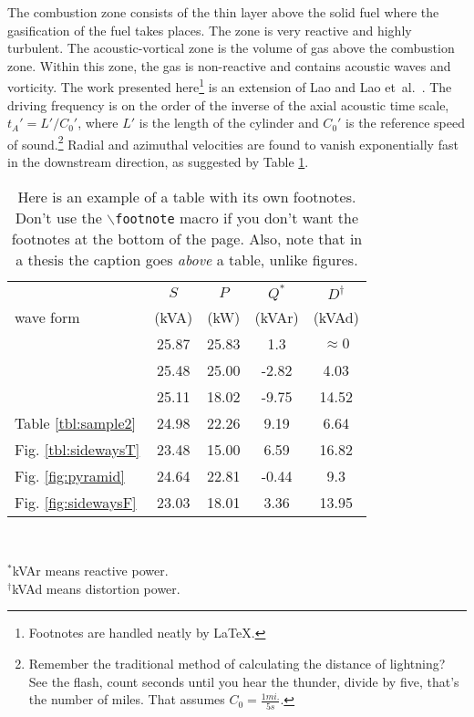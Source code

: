 The combustion zone consists of the thin layer above the solid fuel
where the gasification of the fuel takes places. The zone is very
reactive and highly turbulent. The acoustic-vortical zone is the
volume of gas above the combustion zone. Within this zone, the gas
is non-reactive and contains acoustic waves and vorticity. The work
presented here\footnote{Footnotes are handled neatly by \LaTeX.} is
an extension of Lao \cite{lao:thesis} and Lao et~al.\
\cite{lao:paper}. The driving frequency is on the order of the
inverse of the axial acoustic time scale, $t_A'= L'/C_0'$, where
$L'$ is the length of the cylinder and $C_0'$ is the reference speed
of sound.\footnote{Remember the traditional method of calculating
 the distance of lightning? See the flash, count seconds until you
 hear the thunder, divide by five, that's the number of miles. That
 assumes $C_0=\frac{1 mi.}{5 s}$.} Radial and azimuthal velocities
are found to vanish exponentially fast in the downstream direction,
as suggested by Table \ref{powertable}.

\begin{table}[htb]
\caption[Example of a table with its own footnotes]{\label{powertable}
	Here is an example of a table with its own footnotes.
	Don't use the $\backslash${\tt footnote} macro if you
	don't want the footnotes at the bottom of the page.
	Also, note that in a thesis the caption goes
	\emph{above} a table, unlike figures.
	}
\begin{center}
\begin{tabular}{||l|c|c|c|c||} \hline
	& $S$ & $P$ &   $Q^{\ast}$  & $D^{\dagger}$ \\	%
	wave form & (kVA) & (kW) & (kVAr) & (kVAd) \\  \hline \hline
	& 25.87 & 25.83 & 1.3 & $\approx 0$ \\ \hline
	& 25.48 & 25.00 & -2.82 & 4.03 \\ \hline
	& 25.11 & 18.02 & -9.75 & 14.52 \\ \hline
	Table \ref{tbl:sample2}  & 24.98 & 22.26 & 9.19 & 6.64 \\ \hline
	Fig.  \ref{tbl:sidewaysT}  & 23.48 & 15.00 & 6.59 & 16.82 \\ \hline
	Fig.  \ref{fig:pyramid}  & 24.64 & 22.81 & -0.44 & 9.3 \\ \hline
	Fig.  \ref{fig:sidewaysF}  & 23.03 & 18.01 & 3.36 & 13.95 \\ \hline
	\end{tabular}
   \\ \rule{0mm}{5mm}
   ${}^\ast$kVAr means reactive power.		%
\\ ${}^\dagger$kVAd means distortion power.	%
\end{center}
\end{table}

